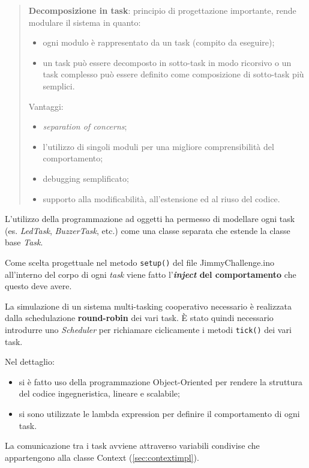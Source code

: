 	\begin{quote}
		\textbf{Decomposizione in task}: principio di progettazione importante, rende modulare il sistema in quanto:
		\begin{itemize}
			\item ogni modulo è rappresentato da un task (compito da eseguire);
			\item un task può essere decomposto in sotto-task in modo ricorsivo o un task complesso può essere definito come composizione di sotto-task più semplici.
		\end{itemize}
		Vantaggi:
		\begin{itemize}
			\item \textit{separation of concerns};
			\item l'utilizzo di singoli moduli per una migliore comprensibilità del comportamento;
			\item debugging semplificato;
			\item supporto alla modificabilità, all'estensione ed al riuso del codice.
		\end{itemize}
	\end{quote}

L'utilizzo della programmazione ad oggetti ha permesso di modellare ogni task (es. \textit{LedTask}, \textit{BuzzerTask}, etc.) come una classe separata che estende la classe base \textit{Task}. 

Come scelta progettuale nel metodo \texttt{setup()} del file JimmyChallenge.ino all'interno del corpo di ogni \textit{task} viene fatto l'\textbf{\textit{inject} del comportamento} che questo deve avere.

La simulazione di un sistema multi-tasking cooperativo necessario è realizzata dalla schedulazione \textbf{round-robin} dei vari task. È stato quindi necessario introdurre uno \textit{Scheduler} per richiamare ciclicamente i metodi \texttt{tick()} dei vari task.

Nel dettaglio:
\begin{itemize}	
	\item si è fatto uso della programmazione Object-Oriented per rendere la struttura del codice ingegneristica, lineare e scalabile;
	\item si sono utilizzate le lambda expression per definire il comportamento di ogni task.
\end{itemize}

La comunicazione tra i task avviene attraverso variabili condivise che appartengono alla classe Context (\ref{sec:contextimpl}).

